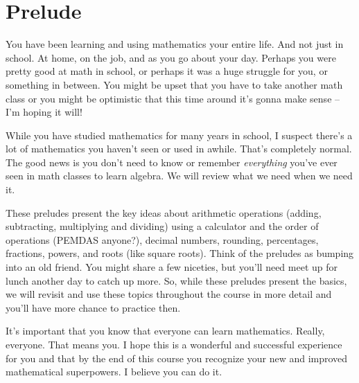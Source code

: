 
\setcounter{chapter}{-1}
\chapter{Prelude} 

You have been learning and using mathematics your entire life.  And not just in school.  At home, on the job, and as you go about your day. Perhaps you were pretty good at math in school, or perhaps it was a huge struggle for you, or something in between.  You might be upset that you have to take another math class or you might be optimistic that this time around it's gonna make sense -- I'm hoping it will!

While you have studied mathematics for many years in school, I suspect there's a lot of mathematics you haven't seen or used in awhile. That's completely normal.  The good news is you don't need to know or remember \emph{everything} you've ever seen in math classes to learn algebra.  We will review what we need when we need it.

These preludes present the key ideas about arithmetic operations (adding, subtracting, multiplying and dividing) using a calculator and the order of operations (PEMDAS anyone?), decimal numbers, rounding, percentages, fractions, powers, and roots (like square roots).  Think of the preludes as bumping into an old friend.  You might share a few niceties, but you'll need meet up for lunch another day to catch up more.  So, while these preludes present the basics, we will revisit and use these topics throughout the course in more detail and you'll have more chance to practice then.

It's important that you know that everyone can learn mathematics.  Really, everyone.  That means you.  I hope this is a wonderful and successful experience for you and that by the end of this course you recognize your new and improved mathematical superpowers.  I believe you can do it.


